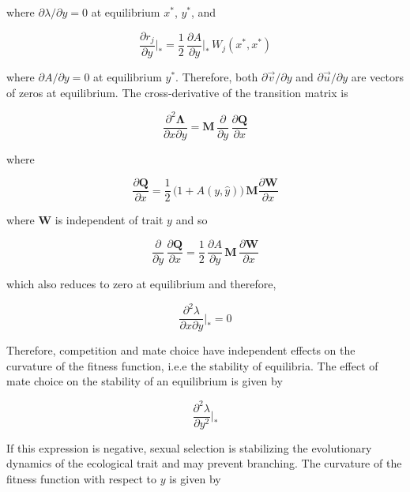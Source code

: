 where $\partial \lambda / \partial y = 0$ at equilibrium $x^*$, $y^*$, and

\begin{equation}
    \frac{\partial r_j}{\partial y}\bigg|_* = \frac{1}{2} \, \frac{\partial A}{\partial y}\bigg|_*\,W_j(x^*,x^*)
\end{equation}

where $\partial A / \partial y = 0$ at equilibrium $y^*$. Therefore, both $\partial \overrightarrow{v} / \partial y$ and $\partial \overrightarrow{u} / \partial y$ are vectors of zeros at equilibrium. The cross-derivative of the transition matrix is

\begin{equation}
    \frac{\partial^2 \pmb \Lambda}{\partial x \partial y} = \pmb M \, \frac{\partial}{\partial y}\,\frac{\partial \pmb Q}{\partial x}
\end{equation}

where 

\begin{equation}
    \frac{\partial \pmb Q}{\partial x} = \frac{1}{2}\,\big(1+A(y,\hat y)\big)\,\pmb M \frac{\partial \pmb W}{\partial x}
\end{equation}

where $\pmb W$ is independent of trait $y$ and so

\begin{equation}
    \frac{\partial}{\partial y}\,\frac{\partial \pmb Q}{\partial x} = \frac{1}{2}\,\frac{\partial A}{\partial y}\,\pmb M\,\frac{\partial \pmb W}{\partial x}
\end{equation}

which also reduces to zero at equilibrium and therefore, 

\begin{equation}
    \frac{\partial^2 \lambda}{\partial x \partial y}\bigg|_* = 0
\end{equation}

Therefore, competition and mate choice have independent effects on the curvature of the fitness function, i.e.e the stability of equilibria. The effect of mate choice on the stability of an equilibrium is given by

\begin{equation}
    \frac{\partial^2 \lambda}{\partial y^2}\bigg|_*
\end{equation}

If this expression is negative, sexual selection is stabilizing the evolutionary dynamics of the ecological trait and may prevent branching. The curvature of the fitness function with respect to $y$ is given by

